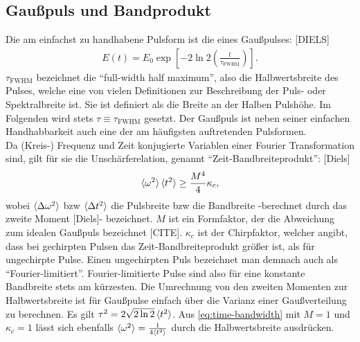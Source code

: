 \documentclass[twoside,        %
               BCOR12mm,       %
               english,ngerman, %
               fleqn,headsepline=false,footsepline=false
              ]{Vorlage/MFPREPORT}
\begin{document}
\subsection{Gaußpuls und Bandprodukt}
\label{seq:bandprod}
Die am einfachst zu handhabene Pulsform ist die eines Gaußpulses: [DIELS]
\begin{align}
    E(t)=E_0\exp\left[-2\ln 2\left(\frac{t}{\tau_{\text{FWHM}}}\right)\right].
    \label{eq:gaus}
\end{align}
$\tau_{\text{FWHM}}$ bezeichnet die ``full-width half maximum'', also die Halbwertsbreite des Pulses, welche eine von vielen Definitionen zur Beschreibung der Puls- oder Spektralbreite ist. Sie ist definiert als die Breite an der Halben Pulshöhe. Im Folgenden wird stets $\tau\equiv\tau_{\text{FWHM}}$ gesetzt. Der Gaußpuls ist neben seiner einfachen Handhabbarkeit auch eine der am häufigsten auftretenden Pulsformen.\\
Da (Kreis-) Frequenz und Zeit konjugierte Variablen einer Fourier Transformation sind, gilt für sie die Unschärferelation, genannt ``Zeit-Bandbreiteprodukt'': [Diels]
\begin{align}
    \braket{\omega^{2}}\braket{t^{2}} \geq \frac{M^{4}}{4}\kappa_c,
    \label{eq:time-bandwidth}
\end{align}
wobei $\braket{\Delta\omega^{2}}$ bzw $\braket{\Delta t^{2}}$ die Pulsbreite bzw die Bandbreite -berechnet durch das zweite Moment [Diels]- bezeichnet. $M$ ist ein Formfaktor, der die Abweichung zum idealen Gaußpuls bezeichnet [CITE]. $\kappa_c$ ist der Chirpfaktor, welcher angibt, dass bei gechirpten Pulsen das Zeit-Bandbreiteprodukt größer ist, als für ungechirpte Pulse. Einen ungechirpten Puls bezeichnet man demnach auch als ``Fourier-limitiert''. Fourier-limitierte Pulse sind also für eine konstante Bandbreite stets am kürzesten.
Die Umrechnung von den zweiten Momenten zur Halbwertsbreite ist für Gaußpulse einfach über die Varianz einer Gaußverteilung zu berechnen. Es gilt $\tau^2=2\sqrt{2 \ln 2}\braket{t^2}$. Aus \cref{eq:time-bandwidth} mit $M=1$ und $\kappa_c=1$ lässt sich ebenfalls $\braket{\omega^2}=\frac{1}{4 \braket{t^2}}$ durch die Halbwertsbreite ausdrücken.
\end{document}

